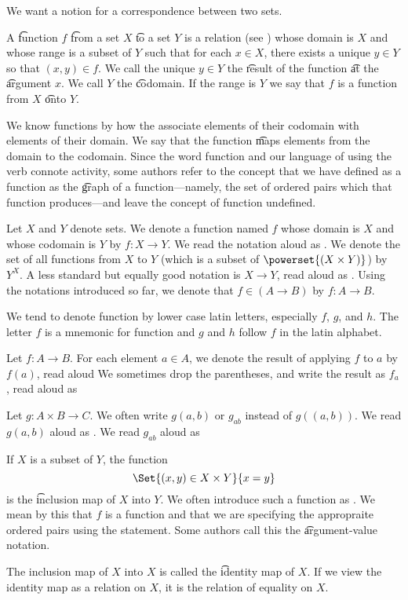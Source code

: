 

We want a notion for a correspondence between two sets.


A \t{function} $f$ \t{from} a set $X$ \t{to} a set $Y$ is a relation (see ) whose domain is $X$ and whose range is a subset of $Y$ such that for each $x \in X$, there exists a unique $y \in Y$ so that $(x, y) \in f$.
We call the unique $y \in Y$ the \t{result} of the function \t{at} the \t{argument} $x$.
We call $Y$ the \t{codomain}.
If the range is $Y$ we say that $f$ is a function from $X$ \t{onto} $Y$.

We know functions by how the associate elements of their codomain with elements of their domain.
We say that the function \t{maps} elements from the domain to the codomain.
Since the word function and our language of using the verb  connote activity, some authors refer to the concept that we have defined as a function as the \t{graph} of a function---namely, the set of ordered pairs which that function produces---and leave the concept of function undefined.


Let $X$ and $Y$ denote sets.
We denote a function named $f$ whose domain is $X$ and whose codomain is $Y$ by $f: X \to Y$.
We read the notation aloud as .
We denote the set of all functions from $X$ to $Y$ (which is a subset of $\powerset{(X \times Y)}$) by $Y^{X}$.
A less standard but equally good notation is $X \to Y$, read aloud as .
Using the notations introduced so far, we denote that $f \in (A \to B)$ by $f: A \to B$.

We tend to denote function by lower case latin letters, especially $f$, $g$, and $h$.
The letter $f$ is a mnemonic for function and $g$ and $h$ follow $f$ in the latin alphabet.

Let $f: A \to B$.
For each element $a \in A$, we denote the result of applying $f$ to $a$ by $f(a)$, read aloud 
We sometimes drop the parentheses, and write the result as $f_a$, read aloud as 

Let $g: A \times B \to C$.
We often write $g(a,b)$ or $g_{ab}$ instead of $g((a,b))$.
We read $g(a, b)$ aloud as .
We read $g_{ab}$ aloud as 


If $X$ is a subset of $Y$, the function
\[
  \Set{(x, y) \in X \times Y}{x = y}
\]
is the \t{inclusion map} of $X$ into $Y$.
We often introduce such a function as .
We mean by this that $f$ is a function and that we are specifying the appropraite ordered pairs using the statement.
Some authors call this the \t{argument-value notation}.

The inclusion map of $X$ into $X$ is called the \t{identity map} of $X$.
If we view the identity map as a relation on $X$, it is the relation of equality on $X$.
